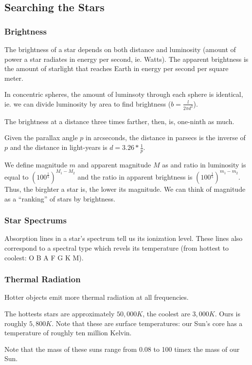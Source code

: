 \subsection{Searching the Stars}
\subsubsection{Brightness}
The brightness of a star depends on both distance and luminosity (amount of power a star radiates in energy per second, ie. Watts). The apparent brightness is the amount of starlight that reaches Earth in energy per second per square meter.

In concentric spheres, the amount of luminsoty through each sphere is identical, ie. we can divide luminosity by area to find brightness ($b = \frac{l}{2\pi d^2}$).

The brightness at a distance three times farther, then, is, one-ninth as much.

Given the parallax angle $p$ in arcseconds, the distance in parsecs is the inverse of $p$ and the distance in light-years is $d = 3.26 * \frac{1}{p}$.

We define magnitude $m$ and apparent magnitude $M$ as and ratio in luminosity is equal to $(100^\frac{1}{5})^{M_1 - M_2}$ and the ratio in apparent brightness is $(100^\frac{1}{5})^{m_1 - m_2}$. Thus, the birghter a star is, the lower its magnitude. We can think of magnitude as a ``ranking'' of stars by brightness.

\subsubsection{Star Spectrums}
Absorption lines in a star's spectrum tell us its ionization level. These lines also correspond to a spectral type which revels its temperature (from hottest to coolest: O B A F G K M).

\subsubsection{Thermal Radiation}
Hotter objects emit more thermal radiation at all frequencies.

The hottests stars are approximately $50,000K$, the coolest are $3,000K$. Ours is roughly $5,800K$. Note that these are surface temperatures: our Sun's core has a temperature of roughly ten million Kelvin.

Note that the mass of these suns range from 0.08 to 100 timex the mass of our Sun.

